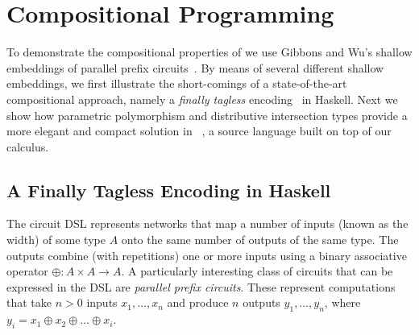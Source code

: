 


% 
% 
% 

\section{Compositional Programming}
\label{sec:overview}



To demonstrate the compositional properties of \fnamee we use Gibbons and Wu's shallow embeddings of
parallel prefix circuits~\cite{DBLP:conf/icfp/GibbonsW14}. By means of several different shallow
embeddings, we first illustrate the short-comings of a state-of-the-art
compositional approach, namely a \emph{finally tagless}
encoding~\cite{CARETTE_2009} in Haskell.
Next we show how parametric polymorphism and distributive intersection types provide
a more elegant and compact solution in \sedel~\cite{bi_et_al:LIPIcs:2018:9214}, a source language built on top of
our \fnamee calculus.


\subsection{A Finally Tagless Encoding in Haskell}

The circuit DSL represents networks that map a number of inputs (known as the width) of some type $A$ onto
the same number of outputs of the same type. The outputs combine (with repetitions) one or more
inputs using a binary associative operator $\oplus : A \times A \to A$.
A particularly interesting class of circuits that can be expressed in the DSL are
\emph{parallel prefix circuits}. These represent computations that take $n > 0$
inputs $x_1, \ldots, x_n$ and produce $n$ outputs $y_1, \ldots, y_n$, where
$y_i = x_1 \oplus x_2 \oplus \ldots \oplus x_i$.

